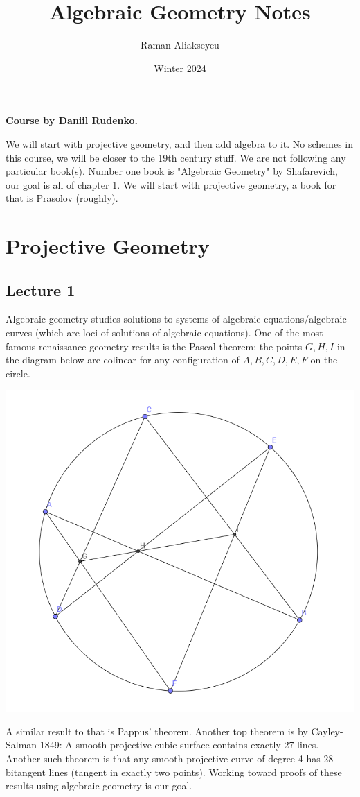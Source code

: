 \documentclass[12pt]{article}
\title{Algebraic Geometry Notes}
\author{Raman Aliakseyeu}
\date{Winter 2024}
\begin{document}
    \maketitle
    \noindent \textbf{Course by Daniil Rudenko.} \par 
    We will start with projective geometry, and then add algebra to it. No schemes in this course, we will be closer to the 19th century stuff. We are not following any particular book(s). Number one book is "Algebraic Geometry" by Shafarevich, our goal is all of chapter 1. We will start with projective geometry, a book for that is Prasolov (roughly). 
    \section{Projective Geometry} 
    \subsection{Lecture 1} 
        Algebraic geometry studies solutions to systems of algebraic equations/algebraic curves (which are loci of solutions of algebraic equations). One of the most famous renaissance geometry results is the Pascal theorem: the points $G, H, I$ in the diagram below are colinear for any configuration of $A, B, C, D, E, F$ on the circle. 
        \begin{center}
            \includegraphics[width = 0.5 \linewidth]{pascals-theorem.PNG}
        \end{center}
        A similar result to that is Pappus' theorem. Another top theorem is by Cayley-Salman 1849: A smooth projective cubic surface contains exactly 27 lines. Another such theorem is that any smooth projective curve of degree 4 has 28 bitangent lines (tangent in exactly two points). Working toward proofs of these results using algebraic geometry is our goal. \par 
\end{document}
